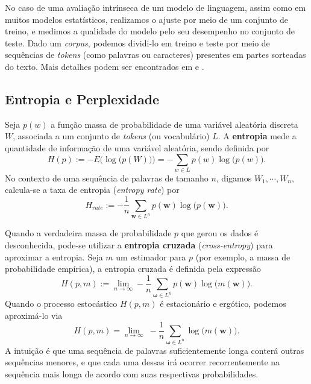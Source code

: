 \documentclass{automatextcc}
\newcommand{\bs}[1]{\boldsymbol{#1}}
\begin{document}
No caso de uma avaliação intrínseca de um modelo de linguagem, assim como em muitos modelos estatísticos, realizamos o ajuste por meio de um conjunto de treino, e medimos a qualidade do modelo pelo seu desempenho no conjunto de teste. Dado um \textit{corpus}, podemos dividi-lo em treino e teste por meio de sequências de \textit{tokens} (como palavras ou caracteres) presentes em partes sorteadas do texto. Mais detalhes podem ser encontrados em \citet{goldberg2017} e \citet{jurafsky2021}.




\subsection{Entropia e Perplexidade}
\label{entropia e perplexidade}

Seja $p(w)$ a função massa de probabilidade de uma variável aleatória discreta $W$, associada a um conjunto de \textit{tokens} (ou vocabulário) $L$. A \textbf{entropia} mede a quantidade de informação de uma variável aleatória, sendo definida por
\begin{equation*}
    H(p) := -E \big(\log \big( p(W)\big) \big) = - \sum_{w \in L} p(w) \log \big(p(w)\big). 
\end{equation*}
No contexto de uma sequência de palavras de tamanho $n$, digamos $W_1, \cdots, W_n$, calcula-se a taxa de entropia (\textit{entropy rate})  por
\begin{equation*}
    H_{rate} := - \frac{1}{n} \sum_{\bs{w} \in L^n} p(\bs{w}) \log \big(p(\bs{w})\big). 
\end{equation*}

Quando a verdadeira massa de probabilidade $p$ que gerou os dados é desconhecida, pode-se utilizar a \textbf{entropia cruzada} (\textit{cross-entropy}) para aproximar a entropia. Seja $m$ um estimador para $p$ (por exemplo, a massa de probabilidade empírica), a entropia cruzada é definida pela expressão
\begin{equation*}
    H(p,m) := \lim_{n \rightarrow \infty}  - \frac{1}{n} \sum_{\bs\omega \in L^n}  p(\bs{w}) \log\big(m(\bs{w})\big) .
\end{equation*}
Quando o processo estocástico $H(p,m)$ é estacionário e ergótico, podemos aproximá-lo via
\begin{equation*}
    H(p,m) = \lim_{n \rightarrow \infty} \; - \frac{1}{n} \sum_{\bs\omega \in L^n} \log\big(m(\bs{w})\big).
\end{equation*}
A intuição é que uma sequência de palavras suficientemente longa conterá outras sequências menores, e que cada uma dessas irá ocorrer recorrentemente na sequência mais longa de acordo com suas respectivas probabilidades.
\end{document}
